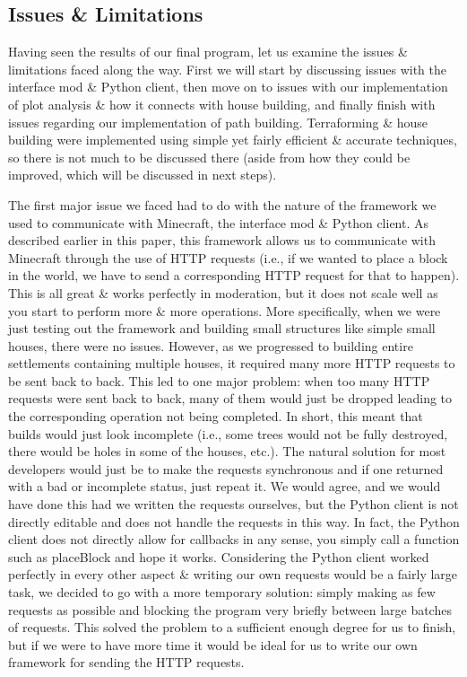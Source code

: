 \documentclass[11pt, oneside]{article}
\begin{document}
\begin{normalsize}
\subsection{Issues \& Limitations}

Having seen the results of our final program, let us examine the issues \& limitations faced along the way. 
First we will start by discussing issues with the interface mod \& Python client, then move on to issues with our implementation of plot analysis \& how it connects with house building, and finally finish with issues regarding our implementation of path building. 
Terraforming \& house building were implemented using simple yet fairly efficient \& accurate techniques, so there is not much to be discussed there (aside from how they could be improved, which will be discussed in next steps).

The first major issue we faced had to do with the nature of the framework we used to communicate with Minecraft, the interface mod \& Python client. 
As described earlier in this paper, this framework allows us to communicate with Minecraft through the use of HTTP requests (i.e., if we wanted to place a block in the world, we have to send a corresponding HTTP request for that to happen). 
This is all great \& works perfectly in moderation, but it does not scale well as you start to perform more \& more operations. 
More specifically, when we were just testing out the framework and building small structures like simple small houses, there were no issues. 
However, as we progressed to building entire settlements containing multiple houses, it required many more HTTP requests to be sent back to back. 
This led to one major problem: when too many HTTP requests were sent back to back, many of them would just be dropped leading to the corresponding operation not being completed. 
In short, this meant that builds would just look incomplete (i.e., some trees would not be fully destroyed, there would be holes in some of the houses, etc.).
The natural solution for most developers would just be to make the requests synchronous and if one returned with a bad or incomplete status, just repeat it. 
We would agree, and we would have done this had we written the requests ourselves, but the Python client is not directly editable and does not handle the requests in this way. 
In fact, the Python client does not directly allow for callbacks in any sense, you simply call a function such as placeBlock and hope it works. 
Considering the Python client worked perfectly in every other aspect \& writing our own requests would be a fairly large task, we decided to go with a more temporary solution: simply making as few requests as possible and blocking the program very briefly between large batches of requests. 
This solved the problem to a sufficient enough degree for us to finish, but if we were to have more time it would be ideal for us to write our own framework for sending the HTTP requests.


\end{normalsize}
\end{document}

